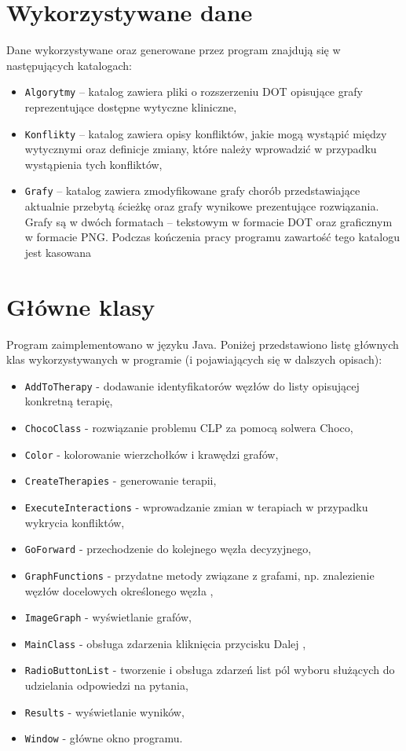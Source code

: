 \section{Wykorzystywane dane}


Dane wykorzystywane oraz generowane przez program znajdują się w następujących katalogach:
\begin{itemize}
\item{\texttt{Algorytmy} – katalog zawiera pliki o rozszerzeniu DOT opisujące grafy reprezentujące dostępne wytyczne kliniczne,}
\item{\texttt{Konflikty} – katalog zawiera opisy konfliktów, jakie mogą wystąpić między wytycznymi oraz definicje zmiany, które należy wprowadzić w przypadku wystąpienia tych konfliktów,}
\item{\texttt{Grafy} – katalog zawiera zmodyfikowane grafy chorób przedstawiające aktualnie przebytą ścieżkę oraz grafy wynikowe prezentujące rozwiązania. Grafy są w dwóch formatach – tekstowym w formacie DOT oraz graficznym w formacie PNG. Podczas kończenia pracy programu zawartość tego katalogu jest kasowana}
\end{itemize}

\section{Główne klasy}
Program zaimplementowano w języku Java. Poniżej przedstawiono listę głównych klas wykorzystywanych w programie (i pojawiających się w dalszych opisach):
\begin{itemize}
\item{\texttt{AddToTherapy} - dodawanie identyfikatorów węzłów do listy opisującej konkretną terapię,}
\item{\texttt{ChocoClass} - rozwiązanie problemu CLP za pomocą solwera Choco,}
\item{\texttt{Color} - kolorowanie wierzchołków i krawędzi grafów,}
\item{\texttt{CreateTherapies} - generowanie terapii,}
\item{\texttt{ExecuteInteractions} - wprowadzanie zmian w terapiach w przypadku wykrycia konfliktów, }
\item{\texttt{GoForward} - przechodzenie do kolejnego węzła decyzyjnego, }
\item{\texttt{GraphFunctions} - przydatne metody związane z grafami, np. znalezienie węzłów docelowych określonego węzła ,}
\item{\texttt{ImageGraph} - wyświetlanie grafów, }
\item{\texttt{MainClass} - obsługa zdarzenia kliknięcia przycisku Dalej ,}
\item{\texttt{RadioButtonList} - tworzenie i obsługa zdarzeń list pól wyboru służących do udzielania odpowiedzi na pytania,}
\item{\texttt{Results} - wyświetlanie wyników,}
\item{\texttt{Window} - główne okno programu.}
\end{itemize}

